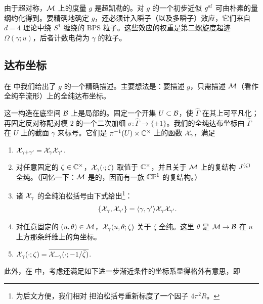 由于超对称，$\CM$ 上的度量 $g$ 是超凯勒的。对 $g$ 的一个初步近似 $g^{\sf}$ 可由朴素的量纲约化得到。要精确地确定 $g$，还必须计入瞬子（以及多瞬子）效应，它们来自 $d=4$ 理论中绕 $S^1$ 缠绕的 BPS 粒子。这些效应的权重是第二螺旋度超迹 $\Omega(\gamma;u)$，后者计数电荷为 $\gamma$ 的粒子。

\subsection{达布坐标}

在 \cite{Gaiotto:2008cd} 中我们给出了 $g$ 的一个精确描述。主要想法是：要描述 $g$，只需描述 $\CM$（看作全纯辛流形）上的全纯达布坐标。

这一构造在底空间 $\CB$ 上是局部的。固定一个开集 $U \subset \CB$，使 $\hat\Gamma$ 在其上可平凡化；再固定反对称配对模 $2$ 的一个二次加细 $\sigma: \hat\Gamma \to \{ \pm 1 \}$。我们的全纯达布坐标由 $\hat\Gamma$ 在 $U$ 上的截面 $\gamma$ 来标号。它们是 $\pi^{-1}(U) \times \IC^\times$ 上的函数 $\CX_\gamma$，满足

\begin{enumerate}[label=\alph*)]

\item $\CX_{\gamma+\gamma'} = \CX_\gamma \CX_{\gamma'}$.

\item 对任意固定的 $\zeta \in \IC^\times$，$\CX_\gamma(\cdot; \zeta)$ 取值于 $\IC^\times$，并且关于 $\CM$ 上的复结构 $J^{\pz}$ 全纯。（回忆一下：$\CM$ 是\hk 的，因而有一族 $\IC\IP^1$ 的复结构。）

\item 诸 $\CX_\gamma$ 的全纯泊松括号由下式给出\footnote{为后文方便，我们相对 \cite{Gaiotto:2008cd} 把泊松括号重新标度了一个因子 $4\pi^2 R$。}：
\begin{equation} \label{ch2:eq:poisson}
\left\{ \CX_\gamma, \CX_{\gamma'} \right\} = \inprod{\gamma, \gamma'} \CX_\gamma \CX_{\gamma'}.
\end{equation}

\item 对任意固定的 $(u, \theta) \in \CM$，$\CX_\gamma(u, \theta; \zeta)$ 关于 $\zeta$ 全纯。这里 $\theta$ 是 $\CM \to \CB$ 在 $u$ 上方那条纤维上的角坐标。

\item $\CX_{\gamma}(\cdot; \zeta) = \overline{\CX_{-\gamma}(\cdot; -1/\bar\zeta)}$.

\end{enumerate}

此外，在 \cite{Gaiotto:2008cd} 中，考虑还满足如下进一步渐近条件的坐标系显得格外有意思，即

